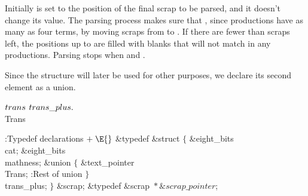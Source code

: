 \yskip\noindent Initially  is set to the position of the
final
scrap to be parsed, and it doesn't change its value. The parsing process
makes sure that , since productions have as
many as four terms,
by moving scraps from  to . If there are
fewer than  scraps left, the positions up to  are filled with
blanks that will not match in any productions. Parsing stops when
 and .

Since the  structure will later be used for other purposes, we
declare its second element as a union.

\Y\B\4\D$\\{trans}$ \5
$\\{trans\_plus}.{}$\\{Trans}\par
\Y\B\4:Typedef declarations\X${}\mathrel+\E{}$\6
\&{typedef} \&{struct} ${}\{{}$\1\6
\&{eight\_bits} \\{cat};\6
\&{eight\_bits} \\{mathness};\6
\&{union} ${}\{{}$\1\6
\&{text\_pointer} \\{Trans};\5
\hbox{}\6{}:Rest of  union\X\2\6
${}\}{}$ \\{trans\_plus};\2\6
${}\}{}$ \&{scrap};\6
\&{typedef} \&{scrap} ${}{*}\&{scrap\_pointer}{}$;\par
\fi

